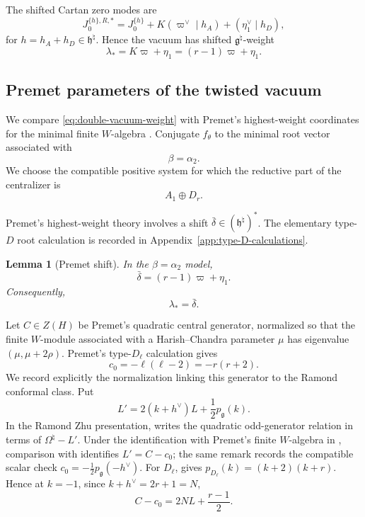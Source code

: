 \documentclass[11pt]{amsart}
\newtheorem{lemma}[theorem]{Lemma}
\theoremstyle{remark}
\numberwithin{equation}{section}
\begin{document}
The shifted Cartan zero modes are
\[
   J^{\{h\},R,*}_0
   =
   J^{\{h\}}_0+
   K(\varpi^\vee\mid h_A)
   +(\eta_1^\vee\mid h_D),
\]
for \(h=h_A+h_D\in\mathfrak h^\natural\).  Hence the vacuum has shifted
\(\mathfrak g^\natural\)-weight
\begin{equation}
\label{eq:double-vacuum-weight}
   \lambda_*
   =
   K\varpi+\eta_1
   =
   (r-1)\varpi+\eta_1.
\end{equation}

\subsection{Premet parameters of the twisted vacuum}
\label{subsec:Premet-vacuum-parameters}

We compare \eqref{eq:double-vacuum-weight} with Premet's highest-weight
coordinates for the minimal finite \(W\)-algebra \cite{Premet2007}.  Conjugate \(f_\theta\) to the minimal root vector
associated with
\[
   \beta=\alpha_2.
\]
We choose the compatible positive system for which the reductive part of the
centralizer is
\[
   A_1\oplus D_r.
\]

Premet's highest-weight theory involves a shift
\(\bar\delta\in(\mathfrak h^\natural)^*\).  The elementary type-\(D\) root
calculation is recorded in Appendix~\ref{app:type-D-calculations}.

\begin{lemma}[Premet shift]
\label{lem:Premet-shift-D}
In the \(\beta=\alpha_2\) model,
\begin{equation}
   \bar\delta
   =
   (r-1)\varpi+\eta_1.
\end{equation}
Consequently,
\[
   \lambda_*=\bar\delta.
\]
\end{lemma}

Let \(C\in Z(H)\) be Premet's quadratic central generator, normalized so that
the finite \(W\)-module associated with a Harish--Chandra parameter
\(\mu\) has eigenvalue \((\mu,\mu+2\rho)\).  Premet's type-\(D_\ell\)
calculation gives
\[
   c_0=-\ell(\ell-2)=-r(r+2).
\]
We record explicitly the normalization linking this generator to the Ramond
conformal class.  Put
\[
   L'=2(k+h^\vee)L+\frac12p_{\mathfrak g}(k).
\]
In the Ramond Zhu presentation, \cite[Equation~(5.1)]{KacMosenederFrajriaPapi2025}
writes the quadratic odd-generator relation in terms of
\(\Omega^\natural-L'\).  Under the identification with Premet's finite
\(W\)-algebra in \cite[Remark~5.8]{KacMosenederFrajriaPapi2025}, comparison
with \cite[Theorem~6.1(iv)]{Premet2007} identifies
\(L'=C-c_0\); the same remark records the compatible scalar check
\(c_0=-\frac12p_{\mathfrak g}(-h^\vee)\).
For \(D_\ell\), \cite[Section~3.1.2]{Jin2026} gives
\(p_{D_\ell}(k)=(k+2)(k+r)\).  Hence at \(k=-1\), since
\(k+h^\vee=2r+1=N\),
\begin{equation}
\label{eq:Premet-C-L-relation}
   C-c_0
   =
   2N L+\frac{r-1}{2}.
\end{equation}
\end{document}
